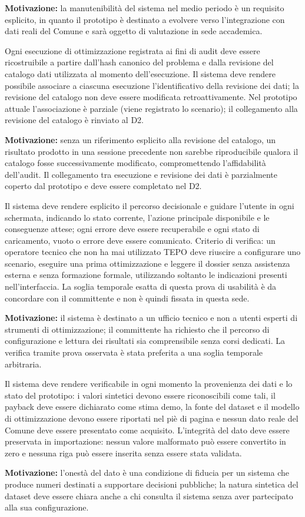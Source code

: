 \textbf{Motivazione:} la manutenibilità del sistema nel medio periodo è un requisito esplicito, in quanto il prototipo è destinato a evolvere verso l'integrazione con dati reali del Comune e sarà oggetto di valutazione in sede accademica.

 \label{rnf:snapshot}
Ogni esecuzione di ottimizzazione registrata ai fini di audit deve essere ricostruibile a partire dall'hash canonico del problema e dalla revisione del catalogo dati utilizzata al momento dell'esecuzione. Il sistema deve rendere possibile associare a ciascuna esecuzione l'identificativo della revisione dei dati; la revisione del catalogo non deve essere modificata retroattivamente. Nel prototipo attuale l'associazione è parziale (viene registrato lo scenario); il collegamento alla revisione del catalogo è rinviato al D2.

\textbf{Motivazione:} senza un riferimento esplicito alla revisione del catalogo, un risultato prodotto in una sessione precedente non sarebbe riproducibile qualora il catalogo fosse successivamente modificato, compromettendo l'affidabilità dell'audit. Il collegamento tra esecuzione e revisione dei dati è parzialmente coperto dal prototipo e deve essere completato nel D2.

 \label{rnf:usabilita}
Il sistema deve rendere esplicito il percorso decisionale e guidare l'utente in ogni schermata, indicando lo stato corrente, l'azione principale disponibile e le conseguenze attese; ogni errore deve essere recuperabile e ogni stato di caricamento, vuoto o errore deve essere comunicato. Criterio di verifica: un operatore tecnico che non ha mai utilizzato TEPO deve riuscire a configurare uno scenario, eseguire una prima ottimizzazione e leggere il dossier senza assistenza esterna e senza formazione formale, utilizzando soltanto le indicazioni presenti nell'interfaccia. La soglia temporale esatta di questa prova di usabilità è da concordare con il committente e non è quindi fissata in questa sede.

\textbf{Motivazione:} il sistema è destinato a un ufficio tecnico e non a utenti esperti di strumenti di ottimizzazione; il committente ha richiesto che il percorso di configurazione e lettura dei risultati sia comprensibile senza corsi dedicati. La verifica tramite prova osservata è stata preferita a una soglia temporale arbitraria.

 \label{rnf:trasparenza}
Il sistema deve rendere verificabile in ogni momento la provenienza dei dati e lo stato del prototipo: i valori sintetici devono essere riconoscibili come tali, il payback deve essere dichiarato come stima demo, la fonte del dataset e il modello di ottimizzazione devono essere riportati nel piè di pagina e nessun dato reale del Comune deve essere presentato come acquisito. L'integrità del dato deve essere preservata in importazione: nessun valore malformato può essere convertito in zero e nessuna riga può essere inserita senza essere stata validata.

\textbf{Motivazione:} l'onestà del dato è una condizione di fiducia per un sistema che produce numeri destinati a supportare decisioni pubbliche; la natura sintetica del dataset deve essere chiara anche a chi consulta il sistema senza aver partecipato alla sua configurazione.
